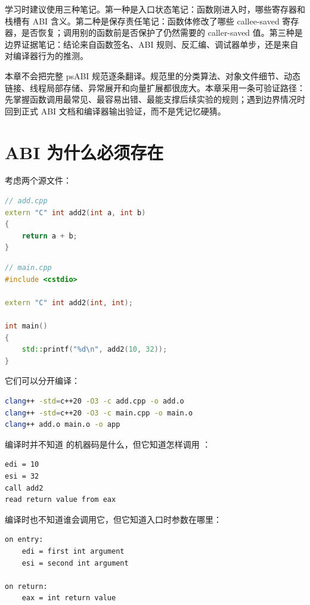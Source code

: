 学习时建议使用三种笔记。第一种是入口状态笔记：函数刚进入时，哪些寄存器和栈槽有 ABI 含义。第二种是保存责任笔记：函数体修改了哪些 callee-saved 寄存器，是否恢复；调用别的函数前是否保护了仍然需要的 caller-saved 值。第三种是边界证据笔记：结论来自函数签名、ABI 规则、反汇编、调试器单步，还是来自对编译器行为的推测。

本章不会把完整 psABI 规范逐条翻译。规范里的分类算法、对象文件细节、动态链接、线程局部存储、异常展开和向量扩展都很庞大。本章采用一条可验证路径：先掌握函数调用最常见、最容易出错、最能支撑后续实验的规则；遇到边界情况时回到正式 ABI 文档和编译器输出验证，而不是凭记忆硬猜。

\section{ABI 为什么必须存在}

考虑两个源文件：

\begin{lstlisting}[language=C++]
// add.cpp
extern "C" int add2(int a, int b)
{
    return a + b;
}
\end{lstlisting}

\begin{lstlisting}[language=C++]
// main.cpp
#include <cstdio>

extern "C" int add2(int, int);

int main()
{
    std::printf("%d\n", add2(10, 32));
}
\end{lstlisting}

它们可以分开编译：

\begin{lstlisting}[language=bash]
clang++ -std=c++20 -O3 -c add.cpp -o add.o
clang++ -std=c++20 -O3 -c main.cpp -o main.o
clang++ add.o main.o -o app
\end{lstlisting}

 编译时并不知道  的机器码是什么，但它知道怎样调用 ：

\begin{lstlisting}
edi = 10
esi = 32
call add2
read return value from eax
\end{lstlisting}

 编译时也不知道谁会调用它，但它知道入口时参数在哪里：

\begin{lstlisting}
on entry:
    edi = first int argument
    esi = second int argument

on return:
    eax = int return value
\end{lstlisting}

